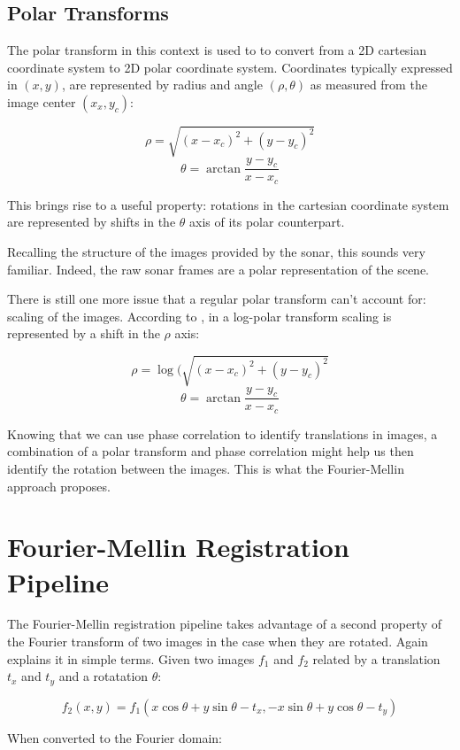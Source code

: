 \subsection{Polar Transforms}

The polar transform in this context is used to to convert from a 2D cartesian coordinate system to 2D polar coordinate system. Coordinates typically expressed in \((x, y)\), are represented by radius and angle \((\rho, \theta)\) as measured from the image center \((x_x, y_c)\):

\[\rho = \sqrt{(x-x_c)^2 + (y - y_c)^2}\]
\[\theta = \arctan{\frac{y - y_c}{x-x_c}}\]

This brings rise to a useful property: rotations in the cartesian coordinate system are represented by shifts in the $\theta$ axis of its polar counterpart.

Recalling the structure of the images provided by the sonar, this sounds very familiar. Indeed, the raw sonar frames are a polar representation of the scene. 

There is still one more issue that a regular polar transform can't account for: scaling of the images. According to \citeauthor{5396234}\cite{5396234}, in a log-polar transform scaling is represented by a shift in the $\rho$ axis:

\[\rho = \log(\sqrt{(x-x_c)^2 + (y - y_c)^2}\]
\[\theta = \arctan{\frac{y - y_c}{x-x_c}}\]

Knowing that we can use phase correlation to identify translations in images, a combination of a polar transform and phase correlation might help us then identify the rotation between the images. This is what the Fourier-Mellin approach proposes.

\section{Fourier-Mellin Registration Pipeline}
\label{sec:fm-registration}

The Fourier-Mellin registration pipeline takes advantage of a second property of the Fourier transform of two images in the case when they are rotated. Again \citeauthor{Reddy1996}\cite{Reddy1996} explains it in simple terms. Given two images \(f_1\) and \(f_2\) related by a translation \(t_x\) and \(t_y\) and a rotatation \(\theta\):

\[f_2(x,y)=f_1(x \cos{\theta} + y \sin{\theta} -t_x, - x \sin{\theta} + y \cos{\theta} - t_y)\]

When converted to the Fourier domain:

